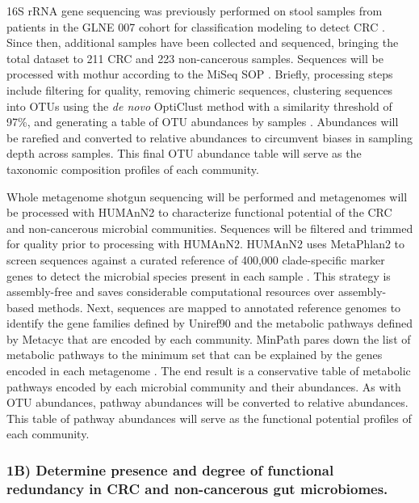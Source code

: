 \documentclass[11pt]{article}
\begin{document}
16S rRNA gene sequencing was previously performed on stool samples from patients in the GLNE 007 cohort for classification modeling to detect CRC \cite{baxter_microbiota-based_2016}.
Since then, additional samples have been collected and sequenced, bringing the total dataset to 211 CRC and 223 non-cancerous samples.
Sequences will be processed with mothur according to the MiSeq SOP \cite{schloss_introducing_2009, kozich_development_2013}.
Briefly, processing steps include filtering for quality, removing chimeric sequences, clustering sequences into OTUs using the \textit{de novo} OptiClust method with a similarity threshold of 97\%,
and generating a table of OTU abundances by samples \cite{westcott_opticlust_2017}.
Abundances will be rarefied and converted to relative abundances to circumvent biases in sampling depth across samples.
This final OTU abundance table will serve as the taxonomic composition profiles of each community.

Whole metagenome shotgun sequencing will be performed and metagenomes will be processed with HUMAnN2 \cite{franzosa_species-level_2018} to characterize functional potential of the CRC and non-cancerous microbial communities.
Sequences will be filtered and trimmed for quality prior to processing with HUMAnN2.
HUMAnN2 uses MetaPhlan2 to screen sequences against a curated reference of 400,000 clade-specific marker genes to detect the microbial species present in each sample \cite{segata_metagenomic_2012}.
This strategy is assembly-free and saves considerable computational resources over assembly-based methods.
Next, sequences are mapped to annotated reference genomes to identify the gene families defined by Uniref90 and the metabolic pathways defined by Metacyc \cite{capsi_metacyc_2017} that are encoded by each community.
MinPath pares down the list of metabolic pathways to the minimum set that can be explained by the genes encoded in each metagenome \cite{ye_parsimony_2009}.
The end result is a conservative table of metabolic pathways encoded by each microbial community and their abundances.
As with OTU abundances, pathway abundances will be converted to relative abundances.
This table of pathway abundances will serve as the functional potential profiles of each community.


\subsubsection*{1B) Determine presence and degree of functional redundancy in CRC and non-cancerous gut microbiomes.}
\end{document}
